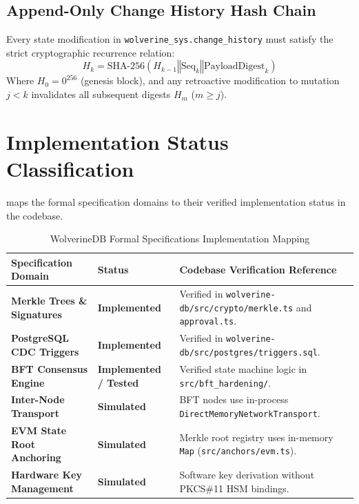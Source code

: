 \subsection{Append-Only Change History Hash Chain}
Every state modification in \texttt{wolverine\_sys.change\_history} must satisfy the strict cryptographic recurrence relation:
\begin{equation}
\label{eq:hash-chain}
H_k = \text{SHA-256}(H_{k-1} \mathbin{\Vert} \text{Seq}_k \mathbin{\Vert} \text{PayloadDigest}_k)
\end{equation}
Where $H_0 = 0^{256}$ (genesis block), and any retroactive modification to mutation $j < k$ invalidates all subsequent digests $H_m$ ($m \ge j$).

\section{Implementation Status Classification}
 maps the formal specification domains to their verified implementation status in the codebase.

\begin{table}[htbp]
\centering
\small
\caption{WolverineDB Formal Specifications Implementation Mapping}
\label{tab:wdb-spec-status}
\begin{tabular}{@{}p{3.5cm}p{3.0cm}p{6.8cm}@{}}
\toprule
\textbf{Specification Domain} & \textbf{Status} & \textbf{Codebase Verification Reference} \\ \midrule
\textbf{Merkle Trees \& Signatures} & \textbf{Implemented} & Verified in \texttt{wolverine-db/src/crypto/merkle.ts} and \texttt{approval.ts}. \\ \addlinespace
\textbf{PostgreSQL CDC Triggers} & \textbf{Implemented} & Verified in \texttt{wolverine-db/src/postgres/triggers.sql}. \\ \addlinespace
\textbf{BFT Consensus Engine} & \textbf{Implemented / Tested} & Verified state machine logic in \texttt{src/bft\_hardening/}. \\ \addlinespace
\textbf{Inter-Node Transport} & \textbf{Simulated} & BFT nodes use in-process \texttt{DirectMemoryNetworkTransport}. \\ \addlinespace
\textbf{EVM State Root Anchoring} & \textbf{Simulated} & Merkle root registry uses in-memory \texttt{Map} (\texttt{src/anchors/evm.ts}). \\ \addlinespace
\textbf{Hardware Key Management} & \textbf{Simulated} & Software key derivation without PKCS\#11 HSM bindings. \\ \bottomrule
\end{tabular}
\end{table}
